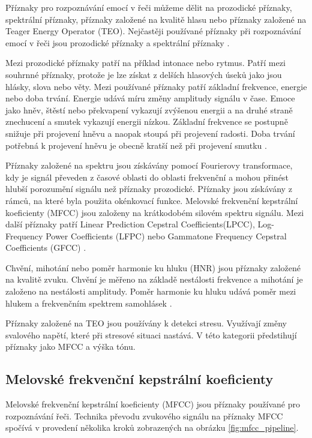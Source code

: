 \documentclass[FM,BP]{tulthesis}
\begin{document}
Příznaky pro rozpoznávání emocí v řeči můžeme dělit na prozodické příznaky, spektrální příznaky, příznaky založené na kvalitě hlasu nebo příznaky založené na Teager Energy Operator (TEO). Nejčastěji používané příznaky při rozpoznávání emocí v řeči jsou prozodické příznaky a spektrální příznaky \cite{DBLP:journals/speech/AkcayO20}.

Mezi prozodické příznaky patří na příklad intonace nebo rytmus. Patří mezi souhrnné příznaky, protože je lze získat z delších hlasových úseků jako jsou hlásky, slova nebo věty. Mezi používané příznaky patří základní frekvence, energie nebo doba trvání. Energie udává míru změny amplitudy signálu v čase. Emoce jako hněv, štěstí nebo překvapení vykazují zvýšenou energii a na druhé straně znechucení a smutek vykazují energii nízkou. Základní frekvence se postupně snižuje při projevení hněvu a naopak stoupá při projevení radosti. Doba trvání potřebná k projevení hněvu je obecně kratší než při projevení smutku \cite{DBLP:journals/speech/AkcayO20}.

Příznaky založené na spektru jsou získávány pomocí Fourierovy transformace, kdy je signál převeden z časové oblasti do oblasti frekvenční a mohou přinést hlubší porozumění signálu než příznaky prozodické. Příznaky jsou získávány z rámců, na které byla použita okénkovací funkce. Melovské frekvenční kepstrální koeficienty (MFCC) jsou založeny na krátkodobém silovém spektru signálu. Mezi další příznaky patří Linear Prediction Cepstral Coefficients(LPCC), Log-Frequency Power Coefficients (LFPC) nebo Gammatone Frequency Cepstral Coefficients (GFCC) \cite{DBLP:journals/speech/AkcayO20}.

Chvění, mihotání nebo poměr harmonie ku hluku (HNR) jsou příznaky založené na kvalitě zvuku. Chvění je měřeno na základě nestálosti frekvence a mihotání je založeno na nestálosti amplitudy. Poměr harmonie ku hluku udává poměr mezi hlukem a frekvenčním spektrem samohlásek \cite{DBLP:journals/speech/AkcayO20}.

Příznaky založené na TEO jsou používány k detekci stresu. Využívají změny svalového napětí, které při stresové situaci nastává. V této kategorii předstihují příznaky jako MFCC a výška tónu.

\subsection{Melovské frekvenční kepstrální koeficienty}
Melovské frekvenční kepstrální koeficienty (MFCC) jsou příznaky používané pro rozpoznávání řeči. Technika převodu zvukového signálu na příznaky MFCC spočívá v provedení několika kroků zobrazených na obrázku \ref{fig:mfcc_pipeline}. 
\end{document}
